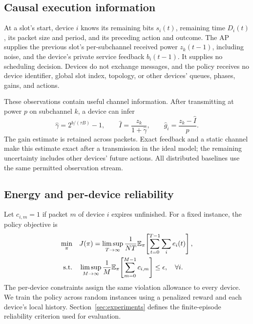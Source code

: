 \subsection{Causal execution information}
At a slot's start, device $i$ knows its remaining bits $s_i(t)$, remaining time
$D_i(t)$, its packet size and period, and its preceding action and outcome.
The AP supplies the previous slot's per-subchannel received power $z_k(t-1)$,
including noise, and the device's private service feedback $b_i(t-1)$.
It supplies no scheduling decision. Devices do not exchange messages, and the
policy receives no device identifier, global slot index, topology, or other
devices' queues, phases, gains, and actions.

These observations contain useful channel information. After transmitting at
power $p$ on subchannel $k$, a device can infer
\begin{equation}
\widehat\gamma=2^{b/(\tau B)}-1,\qquad
\widehat I=\frac{z_k}{1+\widehat\gamma},\qquad
\widehat g_i=\frac{z_k-\widehat I}{p}.\label{eq:estimate}
\end{equation}
The gain estimate is retained across packets. Exact feedback and a static
channel make this estimate exact after a transmission in the ideal model;
the remaining uncertainty includes other devices' future actions. All
distributed baselines use the same permitted observation stream.

\subsection{Energy and per-device reliability}
Let $c_{i,m}=1$ if packet $m$ of device $i$ expires unfinished. For a fixed
instance, the policy objective is
\begin{align}
\min_{\pi}\quad &J(\pi)=\limsup_{T\to\infty}\frac{1}{NT}
 \mathbb{E}_\pi\!\left[\sum_{t=0}^{T-1}\sum_i e_i(t)\right],\label{eq:objective}\\
\text{s.t.}\quad &\limsup_{M\to\infty}\frac{1}{M}
 \mathbb{E}_\pi\!\left[\sum_{m=0}^{M-1}c_{i,m}\right]\le\epsilon,
 \quad \forall i.\nonumber
\end{align}
The per-device constraints assign the same violation allowance to every
device. We train the policy across random instances using a penalized reward
and each device's local history. Section~\ref{sec:experiments} defines the
finite-episode reliability criterion used for evaluation.
